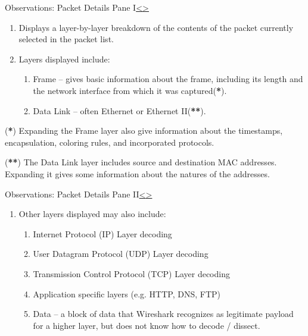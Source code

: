 \documentclass[12pt]{extarticle}
\newenvironment{instructionblock}{\Large\bgroup}{\egroup}
\newcommand{\ben}{\begin{enumerate}}
\newcommand{\een}{\end{enumerate}}
\begin{document}
\pagebreak
\begin{slide}{Observations: Packet Details Pane I}{\hyperref[slide 14]{\textless}\hyperref[slide 16]{\textgreater}}
\begin{instructionblock}
\begin{enumerate}
\item Displays a layer-by-layer breakdown of the contents of the packet currently selected in the packet list.
\item Layers displayed include:
\ben
\item Frame -- gives basic information about the frame, including its length and the network interface from which it was captured(\textbf{*}).
\item Data Link -- often Ethernet or Ethernet II(\textbf{**}).
\een
\end{enumerate}
\end{instructionblock}
\end{slide}

\vspace{2mm}
\noindent
(\textbf{*}) Expanding the Frame layer also give information about the timestamps, encapsulation, coloring rules, and incorporated protocols.

\vspace{2mm}
\noindent
(\textbf{**}) The Data Link layer includes source and destination MAC addresses.  Expanding it gives some information about the natures of the addresses.





\pagebreak
\begin{slide}{Observations: Packet Details Pane II}{\hyperref[slide 15]{\textless}\hyperref[slide 17]{\textgreater}}
\begin{instructionblock}
\begin{enumerate}
\item Other layers displayed may also include:
\ben
\item Internet Protocol (IP) Layer decoding
\item User Datagram Protocol (UDP) Layer decoding
\item Transmission Control Protocol (TCP) Layer decoding
\item Application specific layers (e.g. HTTP, DNS, FTP)
\item Data -- a block of data that Wireshark recognizes as legitimate payload for a higher layer, but does not know how to decode / dissect.
\een
\end{enumerate}
\end{instructionblock}
\end{slide}
\end{document}

